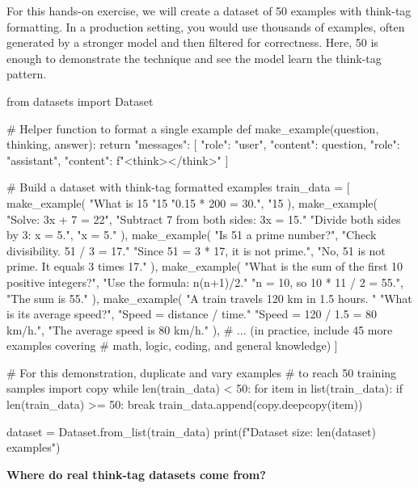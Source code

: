 \begin{chapterenv}
For this hands-on exercise, we will create a dataset of 50 examples with think-tag formatting. In a production setting, you would use thousands of examples, often generated by a stronger model and then filtered for correctness. Here, 50 is enough to demonstrate the technique and see the model learn the think-tag pattern.

\begin{codeblock}[python]
from datasets import Dataset

# Helper function to format a single example
def make_example(question, thinking, answer):
    return {
        "messages": [
            {"role": "user", "content": question},
            {"role": "assistant", "content":
             f"<think>\n</think>"}
        ]
    }

# Build a dataset with think-tag formatted examples
train_data = [
    make_example(
        "What is 15%
        "15%
        "0.15 * 200 = 30.",
        "15%
    ),
    make_example(
        "Solve: 3x + 7 = 22",
        "Subtract 7 from both sides: 3x = 15.\n"
        "Divide both sides by 3: x = 5.",
        "x = 5."
    ),
    make_example(
        "Is 51 a prime number?",
        "Check divisibility. 51 / 3 = 17.\n"
        "Since 51 = 3 * 17, it is not prime.",
        "No, 51 is not prime. It equals 3 times 17."
    ),
    make_example(
        "What is the sum of the first 10 positive integers?",
        "Use the formula: n(n+1)/2.\n"
        "n = 10, so 10 * 11 / 2 = 55.",
        "The sum is 55."
    ),
    make_example(
        "A train travels 120 km in 1.5 hours. "
        "What is its average speed?",
        "Speed = distance / time.\n"
        "Speed = 120 / 1.5 = 80 km/h.",
        "The average speed is 80 km/h."
    ),
    # ... (in practice, include 45 more examples covering
    #  math, logic, coding, and general knowledge)
]

# For this demonstration, duplicate and vary examples
# to reach 50 training samples
import copy
while len(train_data) < 50:
    for item in list(train_data):
        if len(train_data) >= 50:
            break
        train_data.append(copy.deepcopy(item))

dataset = Dataset.from_list(train_data)
print(f"Dataset size: {len(dataset)} examples")
\end{codeblock}

\begin{infobox}
\textbf{Where do real think-tag datasets come from?}


\end{infobox}
\end{chapterenv}
